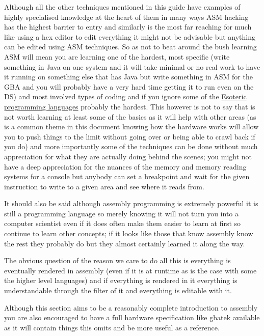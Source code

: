 \documentclass[
]{book}
\begin{document}
Although all the other techniques mentioned in this guide have examples of highly specialised knowledge at the heart of them in many ways ASM hacking has the highest barrier to entry and similarly is the most far reaching for much like using a hex editor to edit everything it might not be advisable but anything can be edited using ASM techniques. So as not to beat around the bush learning ASM will mean you are learning one of the hardest, most specific (write something in Java on one system and it will take minimal or no real work to have it running on something else that has Java but write something in ASM for the GBA and you will probably have a very hard time getting it to run even on the DS) and most involved types of coding and if you ignore some of the \href{http://esolangs.org/wiki/Esoteric_programming_language}{Esoteric programming languages} probably the hardest. This however is not to say that is not worth learning at least some of the basics as it will help with other areas (as is a common theme in this document knowing how the hardware works will allow you to push things to the limit without going over or being able to crawl back if you do) and more importantly some of the techniques can be done without much appreciation for what they are actually doing behind the scenes; you might not have a deep appreciation for the nuances of the memory and memory reading systems for a console but anybody can set a breakpoint and wait for the given instruction to write to a given area and see where it reads from.

It should also be said although assembly programming is extremely powerful it is still a programming language so merely knowing it will not turn you into a computer scientist even if it does often make them easier to learn at first so continue to learn other concepts; if it looks like those that know assembly know the rest they probably do but they almost certainly learned it along the way.

The obvious question of the reason we care to do all this is everything is eventually rendered in assembly (even if it is at runtime as is the case with some the higher level languages) and if everything is rendered in it everything is understandable through the filter of it and everything is editable with it.

Although this section aims to be a reasonably complete introduction to assembly you are also encouraged to have a full hardware specification like gbatek available as it will contain things this omits and be more useful as a reference.
\end{document}
